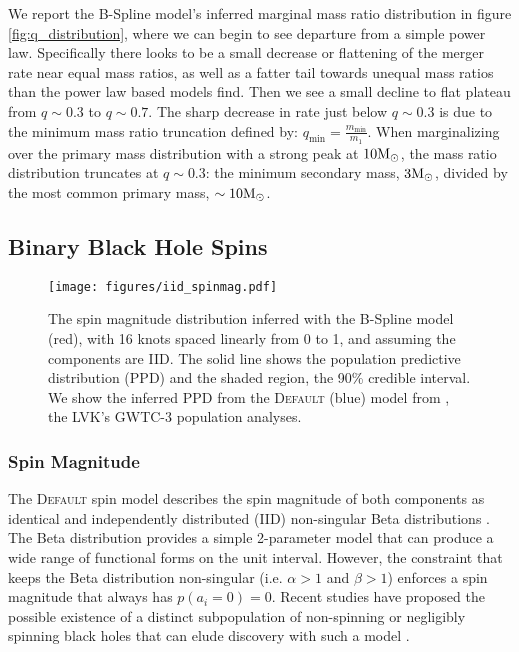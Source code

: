 We report the B-Spline model's inferred marginal mass ratio distribution in figure \ref{fig:q_distribution}, where we can begin to see departure from a simple 
power law. Specifically there looks to be a small decrease or flattening of the merger rate near equal mass ratios, as well as a fatter tail towards unequal mass ratios 
than the power law based models find. Then we see a small decline to flat plateau from $q\sim0.3$ to $q\sim0.7$. The sharp decrease in rate just below 
$q\sim0.3$ is due to the minimum mass ratio truncation defined by: $q_\mathrm{min}=\frac{m_\mathrm{min}}{m_1}$. When marginalizing over the primary mass 
distribution with a strong peak at $10{\rm M}_\odot$, the mass ratio distribution truncates at $q\sim0.3$: the minimum secondary mass, $3{\rm M}_\odot$, 
divided by the most common primary mass, $\sim10{\rm M}_\odot$. 


\subsection{Binary Black Hole Spins} \label{sec:spin_dist}

\begin{figure}
    \begin{centering}    
        \texttt{[image: figures/iid\_spinmag.pdf]}
        \caption{The spin magnitude distribution inferred with the B-Spline model (red), with 16 knots spaced linearly from 0 to 1, and 
        assuming the components are IID. The solid line shows the population predictive distribution (PPD) and the shaded region, the 90\% credible interval. 
        We show the inferred PPD from the \textsc{Default} (blue) model from \citet{o3b_astro_dist}, the LVK's GWTC-3 population analyses.}
        \label{fig:iid_spinmag_dist}
    \end{centering}
\end{figure}

\subsubsection{Spin Magnitude}

The \textsc{Default} spin model describes the spin magnitude of both components as identical and independently distributed (IID) non-singular Beta distributions \citep{Talbot_2017,Wysocki_2019}.
The Beta distribution provides a simple 2-parameter model that can produce a wide range of functional forms on the unit interval. However, the constraint that keeps 
the Beta distribution non-singular (i.e. $\alpha>1$ and $\beta>1$) enforces a spin magnitude that always has $p(a_i=0) = 0$. Recent studies have proposed the possible existence of a 
distinct subpopulation of non-spinning or negligibly spinning black holes that can elude discovery with such a model \citep{FullerMa2019,RouletGWTC2Pop,BuildBetterSpinModels,Callister_NoEvidence,GWTC3MonashSpin}. 

